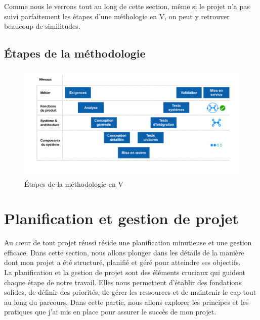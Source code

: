 \documentclass[a4paper, 12pt, french]{article}
\begin{document}
					Comme nous le verrons tout au long de cette section, même si le projet n'a pas suivi parfaitement les étapes d'une méthologie en V, on peut y retrouver beaucoup de similitudes.

				\newpage
				\subsection{Étapes de la méthodologie}
					\begin{figure}[h!]
						\begin{center}
							\includegraphics[width=\linewidth]{images/cycle_v_etapes.png}
						\end{center}
						\caption{Étapes de la méthodologie en V}
						\label{fig:cycle_v_etapes}
					\end{figure}			

			\section{Planification et gestion de projet}
				Au cœur de tout projet réussi réside une planification minutieuse et une gestion efficace. Dans cette section, nous allons plonger dans les détails de la manière dont mon projet a été structuré, planifié et géré pour atteindre ses objectifs.\\

				La planification et la gestion de projet sont des éléments cruciaux qui guident chaque étape de notre travail. Elles nous permettent d'établir des fondations solides, de définir des priorités, de gérer les ressources et de maintenir le cap tout au long du parcours. Dans cette partie, nous allons explorer les principes et les pratiques que j'ai mis en place pour assurer le succès de mon projet.\\
\end{document}
